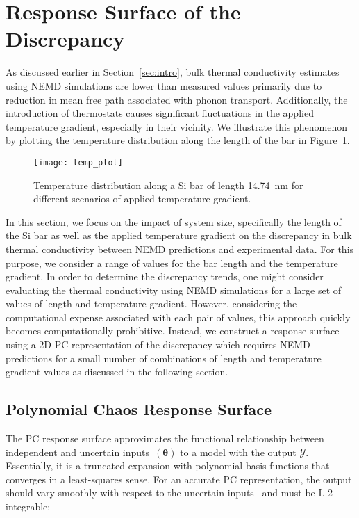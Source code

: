 \section{Response Surface of the Discrepancy}
\label{sec:response}

As discussed earlier in Section~\ref{sec:intro}, bulk thermal conductivity estimates using NEMD simulations
are lower than measured values primarily due to reduction in mean free path associated with phonon transport. 
Additionally, the introduction of thermostats causes significant fluctuations in the applied temperature gradient,
especially in their vicinity. 
We illustrate this phenomenon by plotting the temperature 
distribution along the length of the bar in Figure~\ref{fig:kapitza}. 

\begin{figure}[htbp]
 \begin{center}
  \texttt{[image: temp\_plot]}
\caption{Temperature distribution along a Si bar of length 14.74~nm for
different scenarios of applied temperature gradient.}
\label{fig:kapitza}
\end{center}
\end{figure}

In this section, we focus on the impact of
system size, specifically the length of the Si bar as well as the applied temperature gradient on the discrepancy
in bulk thermal conductivity between NEMD predictions and experimental data. For this purpose, we consider
a range of values for the bar length and the temperature gradient. In order to determine the discrepancy trends, one
might consider evaluating the thermal conductivity using NEMD simulations for a large set of values of length and
temperature gradient. However, considering the computational expense associated with each pair of values, this approach quickly
becomes computationally prohibitive. Instead, we construct a response surface using a 2D 
PC representation of the discrepancy which requires NEMD predictions for a small number of
combinations of length and temperature gradient values as discussed in the following section. 

\subsection{Polynomial Chaos Response Surface}

The PC response surface approximates the functional relationship between independent
and uncertain 
inputs~$(\bm{\theta})$ to a model with the output $\mathcal{Y}$. Essentially, it is a truncated expansion with polynomial 
basis functions that converges in a least-squares sense. For an accurate PC representation, the output should
vary smoothly with respect to the uncertain inputs~\cite{Vohra:2014}  and must
be L-2 integrable:

